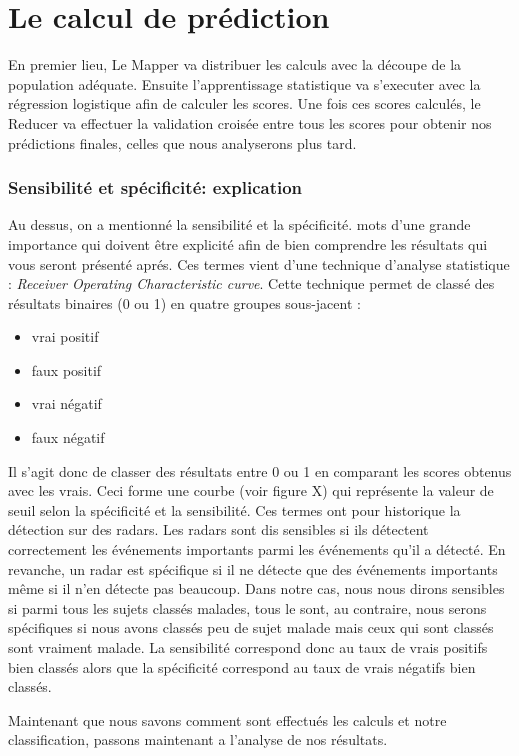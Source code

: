 \section{Le calcul de prédiction}


En premier lieu, Le Mapper va distribuer les calculs avec la découpe de la population adéquate.
Ensuite l'apprentissage statistique va s'executer avec la régression logistique afin de calculer les scores. 
Une fois ces scores calculés, le Reducer va effectuer la validation croisée entre tous les scores pour obtenir nos prédictions finales, celles que nous analyserons plus tard. 

\subsubsection{Sensibilité et spécificité: explication}

Au dessus, on a mentionné la sensibilité et la spécificité. mots d'une grande importance qui doivent être explicité afin de bien comprendre les résultats qui vous seront présenté aprés. 
Ces termes vient d'une technique d'analyse statistique : \textit{Receiver Operating Characteristic curve}. Cette technique  permet de classé des résultats binaires (0 ou 1) en quatre groupes sous-jacent : 
\begin{itemize}
	\item vrai positif
	\item faux positif
	\item vrai négatif
	\item faux négatif
\end{itemize}

Il s'agit donc de classer des résultats entre 0 ou 1 en comparant les scores obtenus avec les vrais. Ceci forme une courbe (voir figure X) qui représente la valeur de seuil selon la spécificité et la sensibilité. 
Ces termes ont pour historique la détection sur des radars. Les radars sont dis sensibles si ils détectent correctement les événements importants parmi les événements qu'il a détecté. En revanche, un radar est spécifique si il ne détecte que des événements importants même si il n'en détecte pas beaucoup.  
Dans notre cas, nous nous dirons sensibles si parmi tous les sujets classés malades, tous le sont, au contraire, nous serons spécifiques si nous avons classés peu de sujet malade mais ceux qui sont classés sont vraiment malade.
La sensibilité correspond donc au taux de vrais positifs bien classés alors que la spécificité correspond au taux de vrais négatifs bien classés.  


Maintenant que nous savons comment sont effectués les calculs et notre classification, passons maintenant a l'analyse de nos résultats. 
